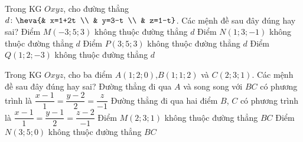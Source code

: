 \begin{ex}%
	Trong KG $Oxyz$, cho đường thẳng $d\colon \heva{& x=1+2t \\ 
		& y=3-t \\ 
		& z=1-t}$. Các mệnh đề sau đây đúng hay sai?
	\choiceTF
	{ Điểm $M\left( -3;5;3 \right)$ không thuộc đường thẳng $d$}
	{ \True Điểm $N\left( 1;3;-1 \right)$ không thuộc đường thẳng $d$}
	{ \True Điểm $P\left( 3;5;3 \right)$ không thuộc đường thẳng $d$}
	{ \True Điểm $Q\left( 1;2;-3 \right)$ không thuộc đường thẳng $d$}
\end{ex}
\begin{ex}%
	Trong KG $Oxyz$, cho ba điểm $A(1;2;0)$,$B(1;1;2)$ và $C(2;3;1)$. Các mệnh đề sau đây đúng hay sai?
	\choiceTF
	{ \True Đường thẳng đi qua $A$ và song song với $BC$ có phương trình là $\dfrac{x-1}{1}=\dfrac{y-2}{2}=\dfrac{z}{-1}$}
	{\True Đường thẳng đi qua hai điểm $B$, $C$ có phương trình là $\dfrac{x-1}{1}=\dfrac{y-1}{2}=\dfrac{z-2}{-1}$}
	{ Điểm $M\left( 2;3;1 \right)$ không thuộc đường thẳng $BC$}
	{\True  Điểm $N\left( 3;5;0 \right)$ không thuộc đường thẳng $BC$}
\end{ex}
